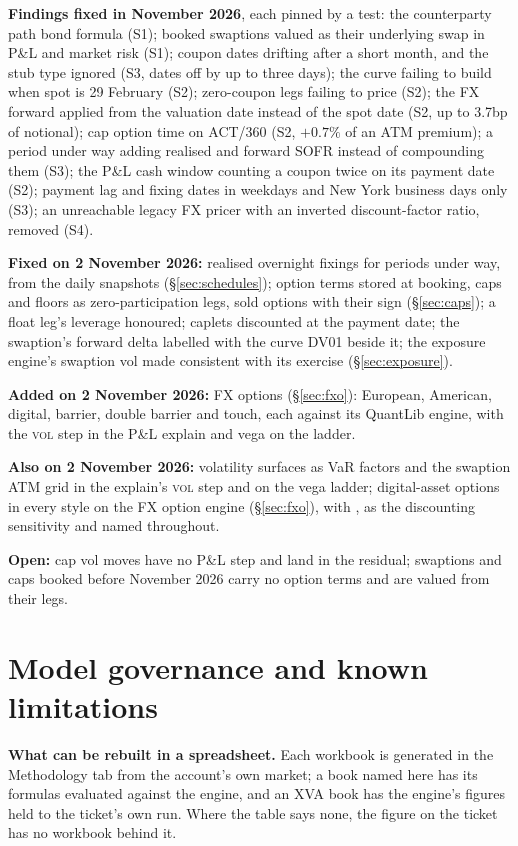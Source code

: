 \documentclass[11pt,a4paper]{article}
\newcommand{\code}[1]{\ifmmode\text{\small\texttt{\detokenize{#1}}}\else{\small\path{#1}}\fi}
\let\plainsection\section
\renewcommand{\section}{\needspace{9\baselineskip}\plainsection}
\begin{document}
\textbf{Findings fixed in November 2026}, each pinned by a test: the counterparty path bond formula (S1); booked swaptions valued as their underlying swap in P\&L and market risk (S1); coupon dates drifting after a short month, and the stub type ignored (S3, dates off by up to three days); the curve failing to build when spot is 29 February (S2); zero-coupon legs failing to price (S2); the FX forward applied from the valuation date instead of the spot date (S2, up to 3.7bp of notional); cap option time on ACT/360 (S2, $+0.7\%$ of an ATM premium); a period under way adding realised and forward SOFR instead of compounding them (S3); the P\&L cash window counting a coupon twice on its payment date (S2); payment lag and fixing dates in weekdays and New York business days only (S3); an unreachable legacy FX pricer with an inverted discount-factor ratio, removed (S4).

\textbf{Fixed on 2 November 2026:} realised overnight fixings for periods under way, from the daily snapshots (\S\ref{sec:schedules}); option terms stored at booking, caps and floors as zero-participation legs, sold options with their sign (\S\ref{sec:caps}); a float leg's leverage honoured; caplets discounted at the payment date; the swaption's forward delta labelled with the curve DV01 beside it; the exposure engine's swaption vol made consistent with its exercise (\S\ref{sec:exposure}).

\textbf{Added on 2 November 2026:} FX options (\S\ref{sec:fxo}): European, American, digital, barrier, double barrier and touch, each against its QuantLib engine, with the \textsc{vol} step in the P\&L explain and vega on the ladder.

\textbf{Also on 2 November 2026:} volatility surfaces as VaR factors and the swaption ATM grid in the explain's \textsc{vol} step and on the vega ladder; digital-asset options in every style on the FX option engine (\S\ref{sec:fxo}), with \code{CRY01}, \code{IR01} as the discounting sensitivity and \code{FUND01} named throughout.

\textbf{Open:} cap vol moves have no P\&L step and land in the residual; swaptions and caps booked before November 2026 carry no option terms and are valued from their legs.

\section{Model governance and known limitations}\label{sec:governance}
\textbf{What can be rebuilt in a spreadsheet.} Each workbook is generated in the Methodology tab from the account's own market; a book named here has its formulas evaluated against the engine, and an XVA book has the engine's figures held to the ticket's own run. Where the table says none, the figure on the ticket has no workbook behind it.
\end{document}
